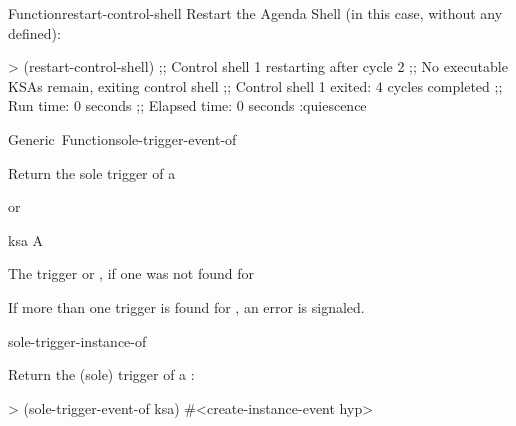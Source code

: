 \documentclass[10pt,twoside,english,pdftex]{article}
\begin{document}
\begin{functiondoc}{Function}{restart-control-shell}{%
     
    \returns{} \superstar}
\fnexample
Restart the Agenda Shell (in this case, without any  defined):
%
\W\supp
\begin{example}
> (restart-control-shell)
;; Control shell 1 restarting after cycle 2
;; No executable KSAs remain, exiting control shell
;; Control shell 1 exited: 4 cycles completed
;; Run time: 0 seconds
;; Elapsed time: 0 seconds
:quiescence
\end{example}

%
\fnnote \pollingnote

\end{functiondoc}


\begin{functiondoc}{Generic~Function}{sole-trigger-event-of}{ 
    \returns{} }
%
%
%

\fnsyntax

\fnpurpose Return the sole trigger  of a 

\fnmethods
{}%
  {\code{(} 
  \returns{}  or \nil}

\fnpackage {}

\fnmodule {}

\fnargs
\begin{args}{ksa}
\arg[ksa] A 
\end{args}

\fnreturns The trigger  or \nil, if one was not found for
  
\fndescription If more than one trigger  is found for
, an error is signaled.

\begin{alsos}{sole-trigger-instance-of}
\end{alsos}

\fnexample
Return the (sole) trigger  of a :
%
\W\supp
\begin{example}
> (sole-trigger-event-of ksa)
#<create-instance-event hyp>
\end{example}

\end{functiondoc}

\end{document}
